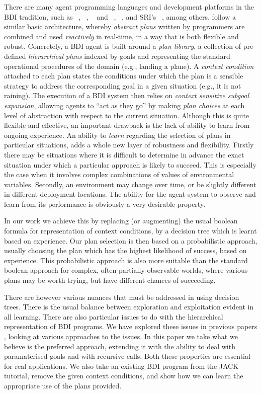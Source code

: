 There are many agent programming languages and development platforms
in the BDI tradition, such as \PRS\ \cite{Georgeff89-PRS},
\JACK~\cite{BusettaRHL:AL99-JACK}, \TAPL~\cite{Hindriks99:Agent} and
\DAPL~\cite{Dastani:JAAMAS08-2APL}, \JASON~\cite{jasonbook}, and SRI's
\SPARK~\cite{MorelyM:AAMAS04-SPARK}, among others. %
follow a similar basic architecture, whereby \emph{abstract plans}
written by programmers are combined and used \emph{reactively} in
real-time, in a way that is both flexible and robust. Concretely, a
BDI agent is built around a \textit{plan library}, a collection of
pre-defined \textit{hierarchical plans} indexed by goals and
representing the standard operational procedures of the domain (e.g.,
landing a plane).
%
A \emph{context condition} attached to each plan states the
conditions under which the plan is a sensible strategy to address the
corresponding goal in a given situation (e.g., it is not raining). The execution
of a BDI system then relies on \textit{context sensitive subgoal
expansion}, allowing agents to ``act as they go'' by making \emph{plan choices}
at each level of abstraction with respect to the current situation.
%
Although this is quite flexible and effective, an important drawback
is the lack of ability to learn from ongoing experience. An ability to
{\it learn} regarding the selection of plans in particular situations,
adds a whole new layer of robustness and flexibility. Firstly there
may be situations where it is difficult to determine in advance the
exact situation under which a particular approach is likely to
succeed. This is especially the case when it involves complex combinations of
values of environmental variables. Secondly, an environment may change
over time, or be slightly different in different deployment
locations. The ability for the agent system to observe and learn
from its performance is obviously a very desirable property.

In our work we achieve this by replacing (or augmenting) the usual
boolean formula for representation of context conditions, by a
decision tree \cite{Mitchell97:ML} which is learnt based on
experience. Our plan selection is then based on a probabilistic
approach, usually choosing the plan which has the highest likelihood
of success, based on experience. This probabilistic approach is also
more suitable than the standard boolean approach for complex, often
partially observable worlds, where various plans may be worth trying,
but have different chances of succeeding.

There are however various nuances that must be addressed in using
decision trees. There is the usual balance between exploration and
exploitation evident in all learning. There are also particular issues
to do with the hierarchical representation of BDI programs. 
%
We have explored these issues in previous papers
\cite{Airiau:IJAT09,aamas}, looking at various approaches to the
issues. In this paper we take what we believe is the preferred
approach, extending it with the ability to deal with paramaterised
goals and with recursive calls.  Both these properties are essential
for real applications. We also take an existing BDI program from the
JACK tutorial, remove the given context conditions, and show how we
can learn the appropriate use of the plans provided.

